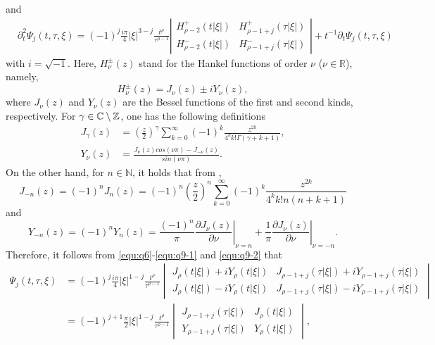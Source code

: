 \documentclass[11pt,twoside]{article}
\newcommand{\R}{\mathbb R}
\newcommand{\N}{\mathbb N}
\newcommand{\p}{\partial}
\newcommand{\f}{\frac}
\theoremstyle{plain}
\theoremstyle{definition}
\theoremstyle{remark}
\numberwithin{equation}{section}
\begin{document}
and
\begin{equation}\label{equ:q9-1}
\begin{aligned}
&\partial_{t}^2 \Psi_{j}(t, \tau, \xi)=(-1)^{j} \frac{i \pi}{4}|\xi|^{3-j} \frac{t^{\rho}}{\tau^{\rho-1}}\left|\begin{array}{ll}
H_{\rho-2}^{+}(t|\xi|) & H_{\rho-1+j}^{+}(\tau|\xi|)  \\
H_{\rho-2}^{-}(t|\xi|) & H_{\rho-1+j}^{-}(\tau|\xi|)
\end{array}\right|+t^{-1}\p_t\Psi_{j}(t, \tau, \xi)
\end{aligned}
\end{equation}
with $i=\sqrt{-1}$.
Here,  $H_{\nu}^{\pm}(z)$ stand for the Hankel functions of order $\nu$ ($\nu\in\R$), namely,
\begin{equation}\label{equ:q9-2}
H_\nu^{\pm}(z) = J_\nu(z) \pm i Y_\nu(z),
\end{equation}
where $J_\nu(z)$ and $Y_\nu(z)$ are the Bessel functions of the first and second kinds, respectively.
For $\gamma\in \mathbb{C} \setminus \Bbb{Z}$, one has the following definitions
\begin{equation*}
\begin{aligned}
J_{\gamma}(z)&=(\f{z}{2})^{\gamma}\sum_{k=0}^{\infty}(-1)^k\f{z^{2k}}{4^kk!\Gamma(\gamma+k+1)},\\
Y_{\nu}(z)&=\f{J_{\nu}(z)cos(\nu\pi)-J_{-\nu}(z)}{sin(\nu\pi)}.
\end{aligned}
\end{equation*}
On the other hand, for $n\in \N$, it holds that from \cite[Section 10]{OLBC}, $$J_{-n}(z)=(-1)^nJ_{n}(z)=(-1)^n(\f{z}{2})^{n}\sum_{k=0}^{\infty}(-1)^k\f{z^{2k}}{4^kk!n(n+k+1)}$$ and
$$
Y_{-n}(z)=(-1)^nY_n(z) = \left.\frac{(-1)^n}{\pi}\frac{\partial J_\nu(z)}{\partial\nu}\right|_{\nu=n}
+ \left.\frac{1}{\pi}\frac{\partial J_\nu(z)}{\partial\nu}\right|_{\nu=-n}.
$$
Therefore, it follows from \eqref{equ:q6}-\eqref{equ:q9-1} and \eqref{equ:q9-2} that
\begin{equation}\label{equ:q9-3}
\begin{aligned}
\Psi_j(t,\tau,\xi)
&= (-1)^{j}\frac{i \pi}{4}|\xi|^{1-j}  \frac{t^{\rho}}{\tau^{\rho-1}}
\begin{vmatrix}
J_{\rho}(t|\xi|) + iY_{\rho}(t|\xi|) & J_{\rho-1+j}(\tau|\xi|) + iY_{\rho-1+j}(\tau|\xi|) \\
J_{\rho}(t|\xi|) - iY_{\rho}(t|\xi|) & J_{\rho-1+j}(\tau|\xi|) - iY_{\rho-1+j}(\tau|\xi|)
\end{vmatrix} \\
&= (-1)^{j+1}\frac{\pi}{2}|\xi|^{1-j}  \frac{t^{\rho}}{\tau^{\rho-1}}
\begin{vmatrix}
J_{\rho-1+j}(\tau|\xi|) & J_{\rho}(t|\xi|) \\
Y_{\rho-1+j}(\tau|\xi|) & Y_{\rho}(t|\xi|)
\end{vmatrix},
\end{aligned}
\end{equation}
\end{document}
